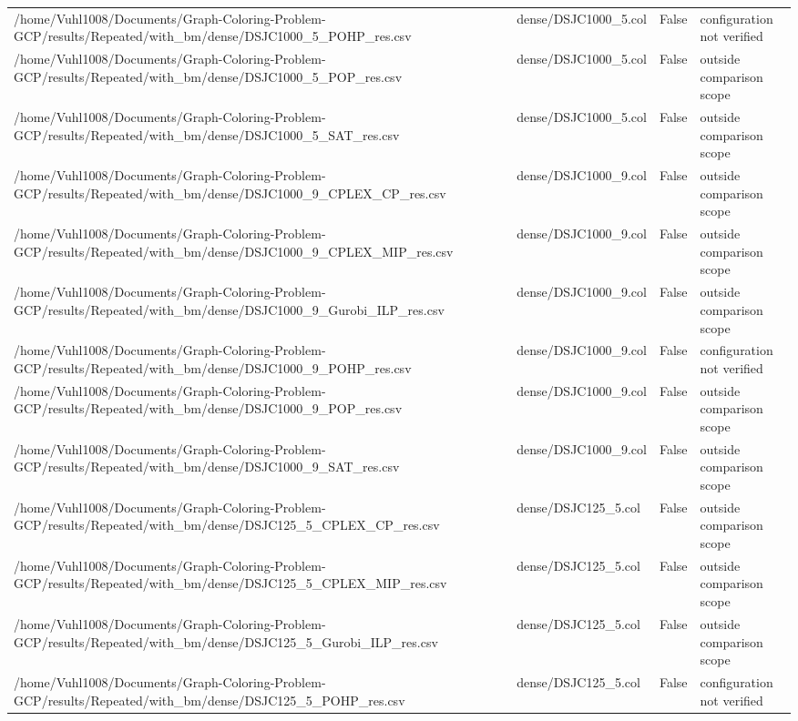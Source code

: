 \begin{table}[htbp]
\begin{tabular}{llll}
/home/Vuhl1008/Documents/Graph-Coloring-Problem-GCP/results/Repeated/with\_bm/dense/DSJC1000\_5\_POHP\_res.csv & dense/DSJC1000\_5.col & False & configuration not verified \\
/home/Vuhl1008/Documents/Graph-Coloring-Problem-GCP/results/Repeated/with\_bm/dense/DSJC1000\_5\_POP\_res.csv & dense/DSJC1000\_5.col & False & outside comparison scope \\
/home/Vuhl1008/Documents/Graph-Coloring-Problem-GCP/results/Repeated/with\_bm/dense/DSJC1000\_5\_SAT\_res.csv & dense/DSJC1000\_5.col & False & outside comparison scope \\
/home/Vuhl1008/Documents/Graph-Coloring-Problem-GCP/results/Repeated/with\_bm/dense/DSJC1000\_9\_CPLEX\_CP\_res.csv & dense/DSJC1000\_9.col & False & outside comparison scope \\
/home/Vuhl1008/Documents/Graph-Coloring-Problem-GCP/results/Repeated/with\_bm/dense/DSJC1000\_9\_CPLEX\_MIP\_res.csv & dense/DSJC1000\_9.col & False & outside comparison scope \\
/home/Vuhl1008/Documents/Graph-Coloring-Problem-GCP/results/Repeated/with\_bm/dense/DSJC1000\_9\_Gurobi\_ILP\_res.csv & dense/DSJC1000\_9.col & False & outside comparison scope \\
/home/Vuhl1008/Documents/Graph-Coloring-Problem-GCP/results/Repeated/with\_bm/dense/DSJC1000\_9\_POHP\_res.csv & dense/DSJC1000\_9.col & False & configuration not verified \\
/home/Vuhl1008/Documents/Graph-Coloring-Problem-GCP/results/Repeated/with\_bm/dense/DSJC1000\_9\_POP\_res.csv & dense/DSJC1000\_9.col & False & outside comparison scope \\
/home/Vuhl1008/Documents/Graph-Coloring-Problem-GCP/results/Repeated/with\_bm/dense/DSJC1000\_9\_SAT\_res.csv & dense/DSJC1000\_9.col & False & outside comparison scope \\
/home/Vuhl1008/Documents/Graph-Coloring-Problem-GCP/results/Repeated/with\_bm/dense/DSJC125\_5\_CPLEX\_CP\_res.csv & dense/DSJC125\_5.col & False & outside comparison scope \\
/home/Vuhl1008/Documents/Graph-Coloring-Problem-GCP/results/Repeated/with\_bm/dense/DSJC125\_5\_CPLEX\_MIP\_res.csv & dense/DSJC125\_5.col & False & outside comparison scope \\
/home/Vuhl1008/Documents/Graph-Coloring-Problem-GCP/results/Repeated/with\_bm/dense/DSJC125\_5\_Gurobi\_ILP\_res.csv & dense/DSJC125\_5.col & False & outside comparison scope \\
/home/Vuhl1008/Documents/Graph-Coloring-Problem-GCP/results/Repeated/with\_bm/dense/DSJC125\_5\_POHP\_res.csv & dense/DSJC125\_5.col & False & configuration not verified \\

\end{tabular}
\end{table}
